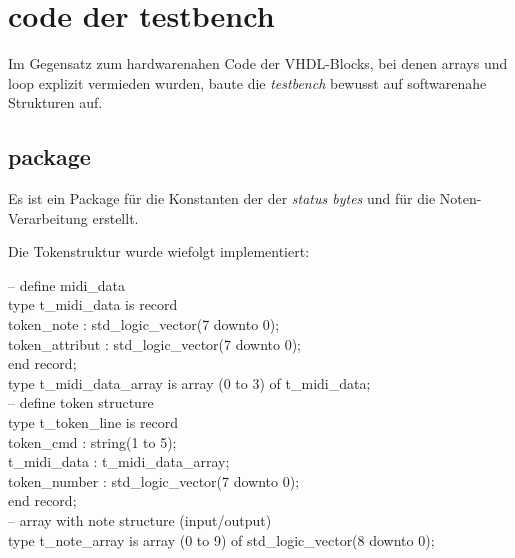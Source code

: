 \section{code der testbench}\label{sec.code_testbench}
Im Gegensatz zum hardwarenahen Code der VHDL-Blocks, bei denen arrays und loop explizit vermieden wurden, baute die \textit{testbench} bewusst auf softwarenahe Strukturen auf.

\subsection*{package}
Es ist ein Package für die Konstanten der der \textit{status bytes} und für die Noten-Verarbeitung erstellt.
\smallskip

Die Tokenstruktur wurde wiefolgt implementiert: \\  
\smallskip 

-- define midi\_data\\
type t\_midi\_data is record  \\                    
\hspace*{12mm}        token\_note : std\_logic\_vector(7 downto 0);  \\                  
\hspace*{12mm}        token\_attribut : std\_logic\_vector(7 downto 0);\\
\hspace*{12mm}    end record;\\

\smallskip
type t\_midi\_data\_array is array (0 to 3) of t\_midi\_data;\\

-- define token structure\\
type t\_token\_line is record\\
\hspace*{12mm}        token\_cmd : string(1 to 5);\\
\hspace*{12mm}        t\_midi\_data : t\_midi\_data\_array;\\
\hspace*{12mm}        token\_number : std\_logic\_vector(7 downto 0);\\
\hspace*{12mm}    end record;\\


        
-- array with note structure (input/output)     \\
type t\_note\_array is array (0 to 9) of std\_logic\_vector(8 downto 0);\\

